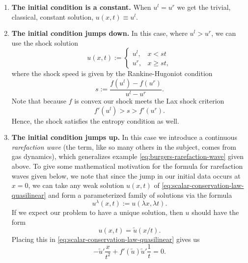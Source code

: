 \begin{enumerate}
\item \textbf{The initial condition is a constant.} When $u^l=u^r$ we get the trivial, classical, constant solution, $u(x,t)\equiv u^l$.
\item \textbf{The initial condition jumps down.} In this case, where $u^l>u^r$, we can use the shock solution
\begin{equation}\label{eq:scalar-riemann-shock-solution}
u(x,t):=\begin{cases}u^l,&x<st\\u^r,&x\geq st,\end{cases}
\end{equation}
where the shock speed is given by the Rankine-Hugoniot condition
\begin{equation}\label{eq:scalar-riemann-shock-speed}
s:=\dfrac{f(u^l)-f(u^r)}{u^l-u^r}.
\end{equation}
Note that because $f$ is convex our shock meets the Lax shock criterion
\begin{equation}\label{eq:scalar-riemann-shock-lax-condition}
f'(u^l)>s>f'(u^r).
\end{equation}
Hence, the shock satisfies the entropy condition as well.\item \textbf{The initial condition jumps up.} In this case we introduce a continuous \emph{rarefaction wave} (the term, like so many others in the subject, comes from gas dynamics), which generalizes example \eqref{eq:burgers-rarefaction-wave} given above. To give some mathematical motivation for the formula for rarefaction waves given below, we note that since the jump in our initial data occurs at $x=0$, we can take any weak solution $u(x,t)$ of \eqref{eq:scalar-conservation-law-quasilinear} and form a parameterized family of solutions via the formula
\begin{equation}\label{eq:scalar-riemann-scaled-solution}
u^\lambda(x,t):=u(\lambda x,\lambda t).
\end{equation}
If we expect our problem to have a unique solution, then $u$ should have the form
\begin{equation}\label{eq:scalar-riemann-self-similar-form}
u(x,t)=\tilde u(x/t).
\end{equation}
Placing this in \eqref{eq:scalar-conservation-law-quasilinear} gives us
\begin{equation}\label{eq:scalar-rarefaction-similarity-equation}
-\tilde u'\dfrac{x}{t^2}+f'(\tilde u)\tilde u'\dfrac1t=0.
\end{equation}

\end{enumerate}
